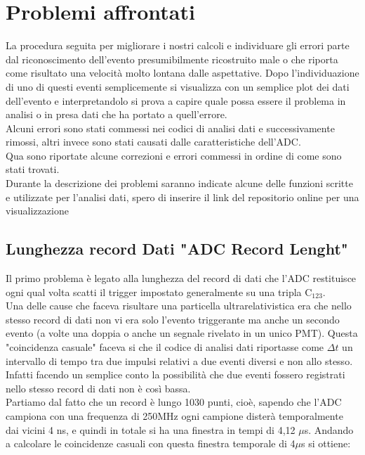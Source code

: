 \documentclass[a4paper]{article}
\begin{document}
\section{Problemi affrontati}
\label{secA:ProblemiADC}
La procedura seguita per migliorare i nostri calcoli e individuare gli errori parte dal riconoscimento dell'evento presumibilmente ricostruito male o che riporta come risultato una velocità molto lontana dalle aspettative. Dopo l'individuazione di uno di questi eventi semplicemente si visualizza con un semplice plot dei dati dell'evento e interpretandolo si prova a capire quale possa essere il problema in analisi o in presa dati che ha portato a quell'errore.\\
Alcuni errori sono stati commessi nei codici di analisi dati e successivamente rimossi, altri invece sono stati causati dalle caratteristiche dell'ADC.\\
Qua sono riportate alcune correzioni e errori commessi in ordine di come sono stati trovati.\\
Durante la descrizione dei problemi saranno indicate alcune delle funzioni scritte e utilizzate per l'analisi dati, spero di inserire il link del repositorio online per una visualizzazione

\subsection{Lunghezza record Dati "ADC Record Lenght"}
\label{secA:RecLenght}
Il primo problema è legato alla lunghezza del record di dati che l'ADC restituisce ogni qual volta scatti il trigger impostato generalmente su una tripla C$_{123}$.\\
Una delle cause che faceva risultare una particella ultrarelativistica era che nello stesso record di dati non vi era solo l'evento triggerante ma anche un secondo evento (a volte una doppia o anche un segnale rivelato in un unico PMT). Questa "coincidenza casuale" faceva si che il codice di analisi dati riportasse come $\Delta t$ un intervallo di tempo tra due impulsi relativi a due eventi diversi e non allo stesso.\\
Infatti facendo un semplice conto la possibilità che due eventi fossero registrati nello stesso record di dati non è così bassa.\\
Partiamo dal fatto che un record è lungo 1030 punti, cioè, sapendo che l'ADC campiona con una frequenza di 250MHz ogni campione disterà temporalmente dai vicini 4 ns, e quindi in totale si ha una finestra in tempi di 4,12 $\mu$s. Andando a calcolare le coincidenze casuali con questa finestra temporale di 4$\mu$s si ottiene:
\end{document}
